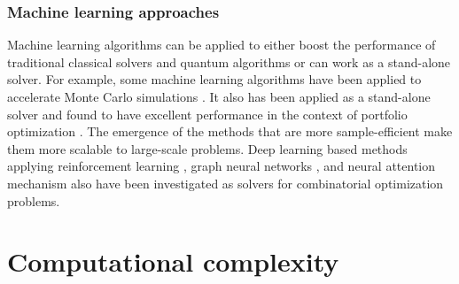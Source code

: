 \documentclass[fleqn,10pt]{wlscirep}
\def\change#1{#1}
\begin{document}
\subsubsection*{Machine learning approaches}
Machine learning algorithms can be applied to either boost the performance of traditional classical solvers and quantum algorithms \cite{mohseni2021deep} or can work as a stand-alone solver.   For example, some machine learning algorithms have been applied to accelerate Monte Carlo \change{simulations} \cite{bojesen2018policy, PhysRevB.95.035105}. 
It also has been applied as a stand-alone solver and found to have excellent performance in the context of portfolio optimization \cite{alcazar2021enhancing}. The emergence of the methods that are more sample-efficient make them more scalable to large-scale problems.   Deep learning based methods applying reinforcement learning \cite{bello2016neural, dai2017learning}, \change{graph neural networks \cite{zhou2020graph,dwivedi2020benchmarking, schuetz2021combinatorial},} and   neural attention mechanism \cite{vinyals2015pointer} also have been investigated as solvers for combinatorial optimization problems.  
 







\section*{Computational complexity}
\end{document}
